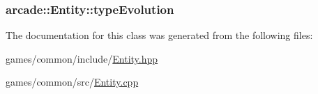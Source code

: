 \hypertarget{classarcade_1_1_entity_a01a2fd9e95413166c79f680995a9cf3a}{
\subsubsection[{type\-Evolution}]{ arcade\-::\-Entity\-::type\-Evolution\hspace{0.3cm}{\ttfamily [protected]}}}\label{classarcade_1_1_entity_a01a2fd9e95413166c79f680995a9cf3a}


The documentation for this class was generated from the following files\-:\begin{DoxyCompactItemize}
\item 
games/common/include/\hyperlink{_entity_8hpp}{Entity.\-hpp}\item 
games/common/src/\hyperlink{_entity_8cpp}{Entity.\-cpp}\end{DoxyCompactItemize}
